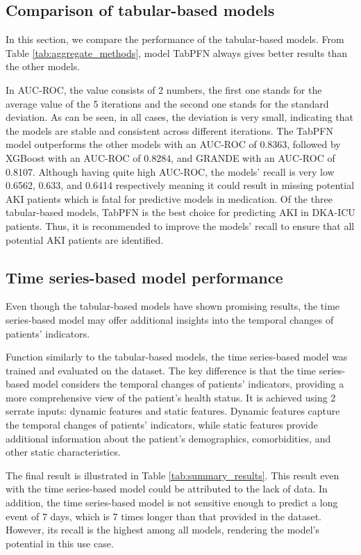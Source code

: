 \documentclass[sn-mathphys-num]{sn-jnl}%
\theoremstyle{thmstyleone}%
\theoremstyle{thmstyletwo}%
\theoremstyle{thmstylethree}%
\begin{document}
\subsection{Comparison of tabular-based models}

In this section, we compare the performance of the tabular-based models. 
From Table \ref{tab:aggregate_methods}, model TabPFN always gives better results than the other models.

In AUC-ROC, the value consists of 2 numbers, the first one stands for the average value of the 5 iterations and the second one stands for the standard deviation.
As can be seen, in all cases, the deviation is very small, indicating that the models are stable and consistent across different iterations.
The TabPFN model outperforms the other models with an AUC-ROC of 0.8363, followed by XGBoost with an AUC-ROC of 0.8284, and GRANDE with an AUC-ROC of 0.8107.
Although having quite high AUC-ROC, the models' recall is very low 0.6562, 0.633, and 0.6414 respectively meaning it could result in missing potential AKI patients which is fatal for predictive models in medication.
Of the three tabular-based models, TabPFN is the best choice for predicting AKI in DKA-ICU patients. 
Thus, it is recommended to improve the models' recall to ensure that all potential AKI patients are identified.


\subsection{Time series-based model performance}

Even though the tabular-based models have shown promising results, the time series-based model may offer additional insights into the temporal changes of patients' indicators.

Function similarly to the tabular-based models, the time series-based model was trained and evaluated on the dataset.
The key difference is that the time series-based model considers the temporal changes of patients' indicators, providing a more comprehensive view of the patient's health status.
It is achieved using 2 serrate inputs: dynamic features and static features.
Dynamic features capture the temporal changes of patients' indicators, while static features provide additional information about the patient's demographics, comorbidities, and other static characteristics.

The final result is illustrated in Table \ref{tab:summary_results}.
This result even with the time series-based model could be attributed to the lack of data.
In addition, the time series-based model is not sensitive enough to predict a long event of 7 days, which is 7 times longer than that provided in the dataset.
However, its recall is the highest among all models, rendering the model's potential in this use case.
\end{document}
